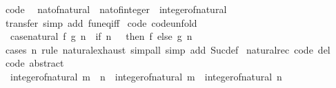 \begin{isabellebody}
\isanewline
%
\endisadelimproof
\isanewline
{}\isamarkupfalse%
\ {\isacharbrackleft}{\kern0pt}code{\isacharbrackright}{\kern0pt}{\isacharcolon}{\kern0pt}\isanewline
\ \ {\isachardoublequoteopen}nat{\isacharunderscore}{\kern0pt}of{\isacharunderscore}{\kern0pt}natural\ {\isacharequal}{\kern0pt}\ nat{\isacharunderscore}{\kern0pt}of{\isacharunderscore}{\kern0pt}integer\ {\isasymcirc}\ integer{\isacharunderscore}{\kern0pt}of{\isacharunderscore}{\kern0pt}natural{\isachardoublequoteclose}\isanewline
%
\isadelimproof
\ \ %
\endisadelimproof
%
\isatagproof
{}\isamarkupfalse%
\ transfer\ {\isacharparenleft}{\kern0pt}simp\ add{\isacharcolon}{\kern0pt}\ fun{\isacharunderscore}{\kern0pt}eq{\isacharunderscore}{\kern0pt}iff{\isacharparenright}{\kern0pt}%
\endisatagproof
{\isafoldproof}%
%
\isadelimproof
\isanewline
%
\endisadelimproof
\isanewline
{}\isamarkupfalse%
\ {\isacharbrackleft}{\kern0pt}code{\isacharcomma}{\kern0pt}\ code{\isacharunderscore}{\kern0pt}unfold{\isacharbrackright}{\kern0pt}{\isacharcolon}{\kern0pt}\isanewline
\ \ {\isachardoublequoteopen}case{\isacharunderscore}{\kern0pt}natural\ f\ g\ n\ {\isacharequal}{\kern0pt}\ {\isacharparenleft}{\kern0pt}if\ n\ {\isacharequal}{\kern0pt}\ {}\ then\ f\ else\ g\ {\isacharparenleft}{\kern0pt}n\ {\isacharminus}{\kern0pt}\ {}{\isacharparenright}{\kern0pt}{\isacharparenright}{\kern0pt}{\isachardoublequoteclose}\isanewline
%
\isadelimproof
\ \ %
\endisadelimproof
%
\isatagproof
{}\isamarkupfalse%
\ {\isacharparenleft}{\kern0pt}cases\ n\ rule{\isacharcolon}{\kern0pt}\ natural{\isachardot}{\kern0pt}exhaust{\isacharparenright}{\kern0pt}\ {\isacharparenleft}{\kern0pt}simp{\isacharunderscore}{\kern0pt}all{\isacharcomma}{\kern0pt}\ simp\ add{\isacharcolon}{\kern0pt}\ Suc{\isacharunderscore}{\kern0pt}def{\isacharparenright}{\kern0pt}%
\endisatagproof
{\isafoldproof}%
%
\isadelimproof
\isanewline
%
\endisadelimproof
\isanewline
{}\isamarkupfalse%
\ natural{\isachardot}{\kern0pt}rec\ {\isacharbrackleft}{\kern0pt}code\ del{\isacharbrackright}{\kern0pt}\isanewline
\isanewline
{}\isamarkupfalse%
\ {\isacharbrackleft}{\kern0pt}code\ abstract{\isacharbrackright}{\kern0pt}{\isacharcolon}{\kern0pt}\isanewline
\ \ {\isachardoublequoteopen}integer{\isacharunderscore}{\kern0pt}of{\isacharunderscore}{\kern0pt}natural\ {\isacharparenleft}{\kern0pt}m\ {\isacharplus}{\kern0pt}\ n{\isacharparenright}{\kern0pt}\ {\isacharequal}{\kern0pt}\ integer{\isacharunderscore}{\kern0pt}of{\isacharunderscore}{\kern0pt}natural\ m\ {\isacharplus}{\kern0pt}\ integer{\isacharunderscore}{\kern0pt}of{\isacharunderscore}{\kern0pt}natural\ n{\isachardoublequoteclose}\isanewline

\end{isabellebody}
